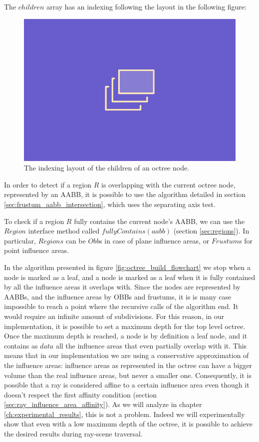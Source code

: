 \documentclass{PoliMi_MasterThesis}
\begin{document}
The $children$ array has an indexing following the layout in the following figure:

\begin{figure}[H]
	\centering
	\includegraphics[width=\textwidth*\real{0.7}]{Images/TODO.png}
	\caption{The indexing layout of the children of an octree node.}
	\label{fig:octree_children_layout}
\end{figure}

In order to detect if a region $R$ is overlapping with the current octree node, represented by an AABB, it is possible to use the algorithm detailed in section \ref{sec:frustum_aabb_intersection}, which uses the separating axis test.

To check if a region $R$ fully contains the current node's AABB, we can use the $Region$ interface method called $fullyContains(aabb)$ (section \ref{sec:regions}). In particular, $Regions$ can be $Obb$s in case of plane influence areas, or $Frustum$s for point influence areas.

In the algorithm presented in figure \ref{fig:octree_build_flowchart} we stop when a node is marked as a leaf, and a node is marked as a leaf when it is fully contained by all the influence areas it overlaps with. Since the nodes are represented by AABBs, and the influence areas by OBBs and frustums, it is is many case impossible to reach a point where the recursive calls of the algorithm end. It would require an infinite amount of subdivisions. For this reason, in our implementation, it is possible to set a maximum depth for the top level octree. Once the maximum depth is reached, a node is by definition a leaf node, and it contains as $data$ all the influence areas that even partially overlap with it. This means that in our implementation we are using a conservative approximation of the influence areas: influence areas as represented in the octree can have a bigger volume than the real influence areas, but never a smaller one. Consequently, it is possible that a ray is considered affine to a certain influence area even though it doesn't respect the first affinity condition (section \ref{sec:ray_influence_area_affinity}). As we will analyze in chapter \ref{ch:experimental_results}, this is not a problem. Indeed we will experimentally show that even with a low maximum depth of the octree, it is possible to achieve the desired results during ray-scene traversal.
\end{document}
